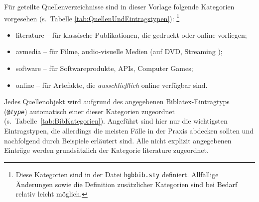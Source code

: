 Für geteilte Quellenverzeichnisse sind in dieser Vorlage folgende Kategorien vorgesehen (s.\ Tabelle
\ref{tab:QuellenUndEintragstypen}):%
\footnote{Diese Kategorien sind in der Datei \nolinkurl{hgbbib.sty} definiert. Allfällige Änderungen sowie die
Definition zusätzlicher Kategorien sind bei Bedarf relativ leicht möglich.}
%
\begin{itemize}
	\item[] \textsf{literature} -- für klassische Publikationen, die gedruckt oder online vorliegen;
	\item[] \textsf{avmedia} -- für Filme, audio-visuelle Medien (auf DVD, Streaming \usw);
	\item[] \textsf{software} -- für Softwareprodukte, APIs, Computer Games;
	\item[] \textsf{online} -- für Artefakte, die \emph{ausschließlich} online verfügbar sind.
\end{itemize}
%
Jedes Quellenobjekt wird aufgrund des angegebenen Biblatex-Eintragtyps (\texttt{@\emph{type}}) automatisch einer
dieser Kategorien zugeordnet (s.\ Tabelle~\ref{tab:BibKategorien}). Angeführt sind hier nur die wichtigsten
Eintragstypen, die allerdings die meisten Fälle in der Praxis abdecken sollten und nachfolgend durch Beispiele
erläutert sind. Alle nicht explizit angegebenen Einträge werden grundsätzlich der Kategorie \textsf{literature}
zugeordnet.

